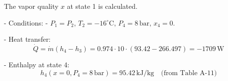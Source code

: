 The vapor quality \( x \) at state 1 is calculated.  

- Conditions:  
  - \( P_1 = P_2 \), \( T_2 = -16^\circ\text{C} \), \( P_4 = 8 \, \text{bar} \), \( x_4 = 0 \).  

- Heat transfer:  
  \[
  \dot{Q} = \dot{m} \left( h_4 - h_3 \right) = 0.974 \cdot 10 \cdot \left( 93.42 - 266.497 \right) = -1709 \, \text{W}
  \]  

- Enthalpy at state 4:  
  \[
  h_4 (x=0, P_4=8 \, \text{bar}) = 95.42 \, \text{kJ/kg} \quad \text{(from Table A-11)}  
  \]